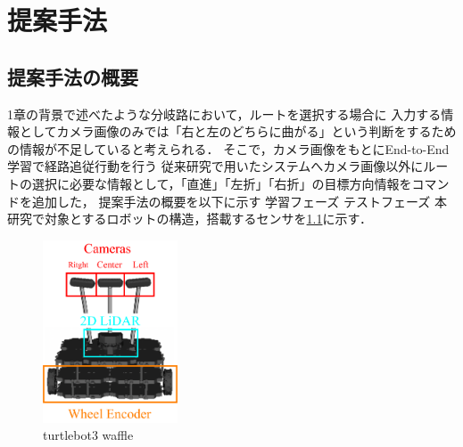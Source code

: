 \chapter{提案手法}\label{chap:method}

\section{提案手法の概要}

1章の背景で述べたような分岐路において，ルートを選択する場合に
入力する情報としてカメラ画像のみでは「右と左のどちらに曲がる」という判断をするための情報が不足していると考えられる．
そこで，カメラ画像をもとにEnd-to-End学習で経路追従行動を行う
従来研究\cite{okada}で用いたシステムへカメラ画像以外にルートの選択に必要な情報として，「直進」「左折」「右折」の目標方向情報をコマンドを追加した，
提案手法の概要を以下に示す
学習フェーズ
テストフェーズ
本研究で対象とするロボットの構造，搭載するセンサを\ref{fig::turtlebot3_gazo}に示す．

\begin{figure}[H]
    \centering
    \includegraphics[width = 4cm]{./figs/turtlebot3_kame.pdf}
    \caption{turtlebot3 waffle}
    \label{fig::turtlebot3_gazo}
\end{figure}



